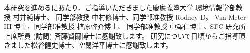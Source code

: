 \begin{acknowledgment}

本研究を進めるにあたり、ご指導いただきました慶應義塾大学 環境情報学部教授 村井純博士、
同学部教授 中村修博士、同学部准教授 Rodney D。 Van Meter III 博士、同学部准教授 植原啓介博士、
同学部准教授 中澤仁博士、SFC 研究所 上席所員 (訪問) 斉藤賢爾博士に感謝致します。
研究について日頃からご指導頂きました松谷健史博士、空閑洋平博士に感謝致します。

\end{acknowledgment}
